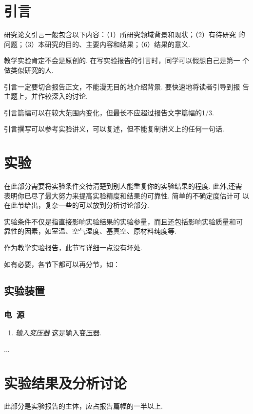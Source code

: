 \documentclass[aps,pre,12pt,preprint,onecolumn,showpacs,showkeys]{revtex4-1}
\begin{document}
\section{引言}

研究论文引言一般包含以下内容：（1）所研究领域背景和现状；（2）有待研究
的问题；（3）本研究的目的、主要内容和结果；（6）结果的意义.

教学实验肯定不会是原创的. 在写实验报告的引言时，同学可以假想自己是第一
个做类似研究的人.

引言一定要切合报告正文，不能漫无目的地介绍背景. 要快速地将读者引导到报
告主题上，并作较深入的讨论.

引言篇幅可以在较大范围内变化，但最长不应超过报告文字篇幅的1/3.

引言撰写可以参考实验讲义，可以复述，但不能复制讲义上的任何一句话.

\section{实验}

在此部分需要将实验条件交待清楚到别人能重复你的实验结果的程度. 此外,还需
表明你已尽了最大努力来提高实验精度和结果的可靠性. 简单的不确定度估计可
以在此节给出，复杂一些的可以放到分析讨论部分.

实验条件不仅是指直接影响实验结果的实验参量，而且还包括影响实验质量和可
靠性的因素，如室温、空气湿度、基真空、原材料纯度等.

作为教学实验报告，此节写详细一点没有坏处.

如有必要，各节下都可以再分节，如：
\subsection{实验装置}

\subsubsection{电~源}
\begin{enumerate}
\item {\it 输入变压器} 这是输入变压器.
\end{enumerate}

...

\section{实验结果及分析讨论}

此部分是实验报告的主体，应占报告篇幅的一半以上.
\end{document}
